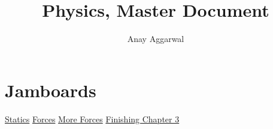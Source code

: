 \documentclass[11pt]{scrartcl}
\title{Physics, Master Document}
\author{Anay Aggarwal}
\begin{document}
\maketitle
\section{Jamboards}
\href{https://jamboard.google.com/d/1uoYdMKXinEdf1\_fIV\_Um4zPiH8XeXSZzDs1etD-xgbI/viewer?f=0}{Statics} \newline
\href{https://jamboard.google.com/d/1ajkcgySLsFFmAIlD7kHRhOTfPmT233VM9uvkb6ygHFg/viewer?f=0}{Forces} \newline
\href{https://jamboard.google.com/d/19tQ1\_l9Pz5J62Dyj3KkGLjumSymWhyoXW8kS4kQQBSg/viewer?f=0}{More Forces} \newline
\href{https://jamboard.google.com/d/1MbDdIBIItbUHffvw165ii3ZKFlsYYW7sVqZbw3JTE5k/viewer?f=0}{Finishing Chapter 3}
\newpage
\end{document}
